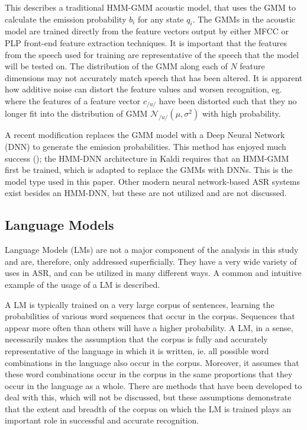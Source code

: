 This describes a traditional HMM-GMM acoustic model, that uses the GMM to calculate the emission probability $b_i$ for any state $q_i$.  The GMMs in the acoustic model are trained directly from the feature vectors output by either MFCC or PLP front-end feature extraction techniques.  It is important that the features from the speech used for training are representative of the speech that the model will be tested on.  The distribution of the GMM along each of $N$ feature dimensions may not accurately match speech that has been altered.  It is apparent how additive noise can distort the feature values and worsen recognition, eg. where the features of a feature vector $c_{/u/}$ have been distorted such that they no longer fit into the distribution of GMM $\mathcal{N}_{/u/}(\mu,\sigma^2)$ with high probability.

A recent modification replaces the GMM model with a Deep Neural Network (DNN) to generate the emission probabilities. This method has enjoyed much success (\cite{zhang:17}); the HMM-DNN architecture in Kaldi requires that an HMM-GMM first be trained, which is adapted to replace the GMMs with DNNs.  This is the model type used in this paper.  Other modern neural network-based ASR systems exist besides an HMM-DNN, but these are not utilized and are not discussed.



\subsection{Language Models}\label{sec:lang-mod}

Language Models (LMs) are not a major component of the analysis in this study and are, therefore, only addressed superficially.  They have a very wide variety of uses in ASR, and can be utilized in many different ways.  A common and intuitive example of the usage of a LM is described.

A LM is typically trained on a very large corpus of sentences, learning the probabilities of various word sequences that occur in the corpus.  Sequences that appear more often than others will have a higher probability.  A LM, in a sense, necessarily makes the assumption that the corpus is fully and accurately representative of the language in which it is written, ie. all possible word combinations in the language also occur in the corpus. Moreover, it assumes that these word combinations occur in the corpus in the same proportions that they occur in the language as a whole.  There are methods that have been developed to deal with this, which will not be discussed, but these assumptions demonstrate that the extent and breadth of the corpus on which the LM is trained plays an important role in successful and accurate recognition.  

